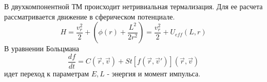 В двухкомпонентной ТМ происходит нетривиальная термализация. Для ее расчета рассматривается движение в сферическом потенциале.
\begin{equation*}	
	H = \frac{v_{r}^{2}}{2} + \left( {\phi(r) + \frac{L^{2}}{2r^{2}}} \right) = \frac{v_{r}^{2}}{2} + U_{eff}(L,r)
\end{equation*}
В уравнении Больцмана
\begin{equation*}
	\frac{df}{dt} = C\left( {\vec{r},\vec{v}} \right) + St \left[ f( \vec{r},\vec{v}')\right] \left( {\vec{r},\vec{v}} \right)
\end{equation*}
идет переход к параметрам $E,L$ - энергия и момент импульса.

